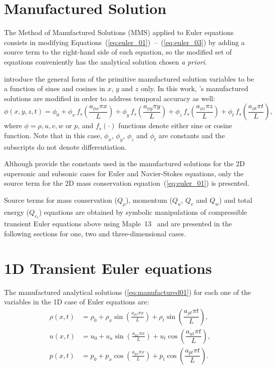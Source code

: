 \documentclass[10pt]{article}
\begin{document}
\section{Manufactured Solution}

The Method of Manufactured Solutions (MMS) applied to Euler equations consists in modifying Equations~(\ref{eq:euler_01})~--~(\ref{eq:euler_03}) by adding a source term to the right-hand side of each equation, so the modified set of equations conveniently has the analytical solution chosen \textit{a priori}.

\citet{Roy2002} introduce the general form of the primitive manufactured solution variables to be  a function of sines and cosines in $x$, $y$ and $z$ only. In this work, \citet{Roy2002}'s manufactured solutions are modified in order to address temporal accuracy as well:
\begin{equation}
 \label{eq:manufactured01}
  \phi (x,y,z,t) = \phi_0+ \phi_x\, f_s \left(\frac{a_{\phi x} \pi x}{L} \right) +  \phi_y \,f_s\left(\frac{a_{\phi y} \pi y}{L}\right) + \phi_z \,f_s\left(\frac{a_{\phi z} \pi z}{L}\right)+ \phi_t \,f_s\left(\frac{a_{\phi t} \pi t}{L}\right),
\end{equation}
where $\phi=\rho,u,v,w$ or $p$, and $f_s(\cdot)$ functions denote either sine or cosine function. Note that in this case, $\phi_x$, $\phi_y$, $\phi_z$  and $\phi_t$ are constants  and the subscripts do not denote differentiation.


Although \citet{Roy2002} provide the constants used in the manufactured solutions for the 2D supersonic and subsonic cases for Euler and Navier-Stokes equations, only the source term for the 2D mass conservation equation~(\ref{eq:euler_01}) is presented.


Source terms  for mass conservation ($Q_\rho$), momentum ($Q_u$, $Q_v$ and $Q_w$)  and total energy ($Q_{e_t}$) equations are obtained by symbolic manipulations of compressible transient Euler equations above using Maple~13~\citep{Maple} and are presented in the following sections for  one, two and three-dimensional cases.




\section{1D Transient Euler equations}

The manufactured analytical solutions (\ref{eq:manufactured01}) for each one of the variables in the 1D case of Euler equations are:
\begin{equation}
\begin{split}
\label{eq:manufactured_1d}
\rho\left(x,t\right) &=  \rho_{0}+ \rho_{x} \sin\left(\frac{a_{ \rho x} \pi x}{L}\right)+ \rho_t \sin\left(\dfrac{a_{\rho t} \pi t}{L}\right),\\
u\left(x,t\right) &= u_{0}+u_{x} \sin\left(\frac{a_{u x} \pi x}{L}\right) + u_t \cos\left(\dfrac{a_{u t} \pi t}{L}\right),\\
p\left(x,t\right) &= p_{0}+p_{x} \cos\left(\frac{a_{p x} \pi x}{L}\right)+ p_t \cos\left(\dfrac{a_{p t} \pi t}{L}\right).\\
\end{split}
\end{equation}
\end{document}
